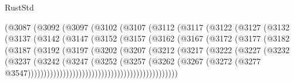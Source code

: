 \begin{lexlean}{RustStd}
\begin{coremodule}
                    (@3087
                      (@3092
                        (@3097
                          (@3102
                            (@3107
                              (@3112
                                (@3117
                                  (@3122
                                    (@3127
                                      (@3132
                                        (@3137
                                          (@3142
                                            (@3147
                                              (@3152
                                                (@3157
                                                  (@3162
                                                    (@3167
                                                      (@3172
                                                        (@3177
                                                          (@3182
                                                            (@3187
                                                              (@3192
                                                                (@3197
                                                                  (@3202
                                                                    (@3207
                                                                      (@3212
                                                                        (@3217
                                                                          (@3222
                                                                            (@3227
                                                                              (@3232
                                                                                (@3237
                                                                                  (@3242
                                                                                    (@3247
                                                                                      (@3252
                                                                                        (@3257
                                                                                          (@3262
                                                                                            (@3267
                                                                                              (@3272
                                                                                                (@3277
                                                                                                  @3547)))))))))))))))))))))))))))))))))))))))))))))))

\end{coremodule}
\end{lexlean}
